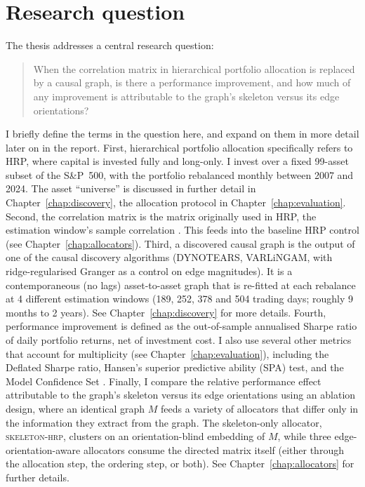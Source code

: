 \documentclass[11pt, a4paper]{report}
\newcommand{\skelhrp}{\textsc{skeleton-hrp}}
\begin{document}
\section{Research question}
\label{sec:question}

The thesis addresses a central research question:

\begin{quote}
When the
correlation matrix in hierarchical portfolio allocation is
replaced by a causal graph, is there a performance
improvement, and how much of any improvement is attributable
to the graph's skeleton versus its edge orientations?
\end{quote}

\noindent I briefly define the terms in the question here, and
expand on them in more detail later on in the report.
First, hierarchical portfolio allocation specifically refers to
HRP, where capital is invested fully and long-only. I invest over
a fixed 99-asset subset of the S\&P~500, with the portfolio
rebalanced monthly between 2007 and 2024. The asset ``universe''
is discussed in further detail in Chapter~\ref{chap:discovery},
the allocation protocol in Chapter~\ref{chap:evaluation}.
Second, the correlation matrix is the matrix originally used in HRP,
the estimation window's sample correlation
\cite{lopezdeprado2016hrp}. This feeds into the baseline HRP
control (see Chapter~\ref{chap:allocators}).
Third, a discovered causal graph is the output of one of the causal
discovery algorithms (DYNOTEARS, VARLiNGAM, with ridge-regularised
Granger as a control on edge magnitudes). It is a contemporaneous (no lags)
asset-to-asset graph that is re-fitted at each rebalance
at 4 different estimation windows 
(189, 252, 378 and 504 trading days; roughly 9 months to 2 years).
See Chapter~\ref{chap:discovery} for more details.
Fourth, performance improvement is defined as the out-of-sample 
annualised Sharpe ratio of daily portfolio returns, net of 
investment cost. I also use several other metrics that account 
for multiplicity (see Chapter~\ref{chap:evaluation}), including the 
Deflated Sharpe ratio, Hansen's superior predictive ability (SPA) test, and the Model Confidence Set
\cite{bailey2014deflated,hansen2005spa,hansen2011mcs}.
Finally, I compare the relative performance effect attributable to
the graph's skeleton versus its edge orientations using an ablation design, where an identical graph $M$ feeds
a variety of allocators that differ only in the information they
extract from the graph. The skeleton-only allocator, \skelhrp{},
clusters on an orientation-blind embedding of $M$, while three 
edge-orientation-aware allocators consume the directed matrix itself
(either through the allocation step, the ordering step, or both).
See Chapter~\ref{chap:allocators} for further details.
\end{document}
